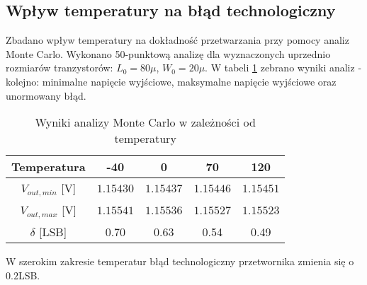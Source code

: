 \documentclass[10pt,a4paper,twoside]{report}
\theoremstyle{definition}
\theoremstyle{definition}
\theoremstyle{definition}
\theoremstyle{definition}
\theoremstyle{definition}
\begin{document}
{{{{{	\subsection{Wpływ temperatury na błąd technologiczny}
	{	Zbadano wpływ temperatury na dokładność przetwarzania przy pomocy analiz Monte Carlo. Wykonano 50-punktową analizę dla wyznaczonych uprzednio rozmiarów tranzystorów: $L_0 = 80\mu$, $W_0 = 20\mu$. W tabeli \ref{tab:mc_temp} zebrano wyniki analiz - kolejno: minimalne napięcie wyjściowe, maksymalne napięcie wyjściowe oraz unormowany błąd.}
	\begin{table}[!ht]
	\begin{center}
		\begin{tabular}{|c|c|c|c|c|}
			\hline 
			Temperatura & -40 & 0 & 70  & 120\\ 
			\hline 
			$V_{out,min}$ [V] & $1.15430$ & $1.15437$ & $1.15446$ & $1.15451$ \\ 
			\hline
			$V_{out,max}$ [V] & $1.15541$ & $1.15536$ & $1.15527$ & $1.15523$\\ 
			\hline 
			$\delta$ [LSB]  & 0.70 & 0.63 & 0.54 & 0.49\\
			\hline
		\end{tabular} 
	\end{center}
	\caption{Wyniki analizy Monte Carlo w zależności od temperatury}
	\label{tab:mc_temp}
	\end{table}
	{	W szerokim zakresie temperatur błąd technologiczny przetwornika zmienia się o $0.2$LSB. }
}}}}}
\end{document}

